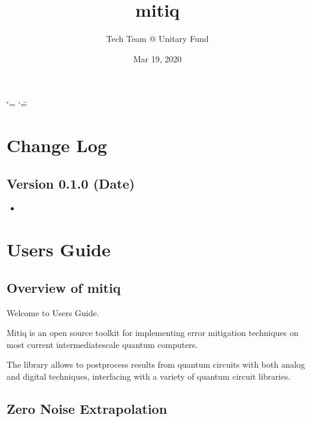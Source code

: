 \documentclass[letterpaper,10pt,english]{sphinxmanual}
\title{mitiq}
\date{Mar 19, 2020}
\author{Tech Team @ Unitary Fund}
\begin{document}
\ifdefined\shorthandoff
  \ifnum\catcode`\=\string=\active\shorthandoff{=}\fi
  \ifnum\catcode`\"=\active{}\fi
\fi

\pagestyle{empty}
\sphinxmaketitle
\pagestyle{plain}
\sphinxtableofcontents
\pagestyle{normal}
\label{\detokenize{index::doc}}



\chapter{Change Log}
\label{\detokenize{changelog:change-log}}\label{\detokenize{changelog:changelog}}\label{\detokenize{changelog::doc}}

\section{Version 0.1.0 (Date)}
\label{\detokenize{changelog:version-0-1-0-date}}\begin{itemize}
\item {} 

\end{itemize}


\chapter{Users Guide}
\label{\detokenize{guide/guide:users-guide}}\label{\detokenize{guide/guide:guide}}\label{\detokenize{guide/guide::doc}}

\section{Overview of mitiq}
\label{\detokenize{guide/guide-overview:overview-of-mitiq}}\label{\detokenize{guide/guide-overview::doc}}
Welcome to  Users Guide.

Mitiq is an open source toolkit for implementing error mitigation techniques on most current intermediate\sphinxhyphen{}scale quantum computers.

The library allows to postprocess results from quantum circuits with both analog and digital techniques, interfacing with a variety of quantum circuit libraries.


\section{Zero Noise Extrapolation}
\label{\detokenize{guide/guide-zne:zero-noise-extrapolation}}\label{\detokenize{guide/guide-zne::doc}}
\end{document}
